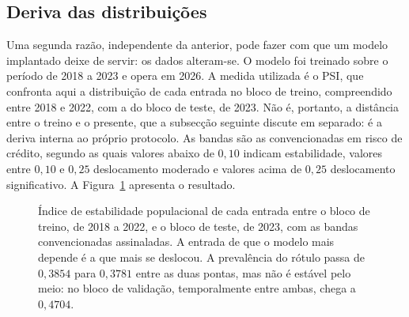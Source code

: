 \subsection{Deriva das distribuições}

Uma segunda razão, independente da anterior, pode fazer com que um modelo implantado deixe de servir:
os dados alteram-se. O modelo foi treinado sobre o período de 2018 a 2023 e opera em 2026. A medida
utilizada é o \gls{PSI}, que confronta aqui a distribuição de cada entrada no bloco de treino,
compreendido entre 2018 e 2022, com a do bloco de teste, de 2023. Não é, portanto, a distância entre
o treino e o presente, que a subsecção seguinte discute em separado: é a deriva interna ao próprio
protocolo. As bandas são as convencionadas em risco de crédito, segundo as quais valores
abaixo de $0{,}10$
indicam estabilidade, valores entre $0{,}10$ e $0{,}25$ deslocamento moderado e valores acima de
$0{,}25$ deslocamento significativo. A Figura~\ref{fig:av_deriva} apresenta o resultado.

\begin{figure}[ht]
\centering
{}
\caption[Deslocamento das distribuições de entrada]{Índice de estabilidade populacional de cada
entrada entre o bloco de treino, de 2018 a 2022, e o bloco de teste, de 2023, com as bandas
convencionadas assinaladas. A entrada de que o modelo mais depende é a que mais se deslocou. A
prevalência do rótulo passa de $0{,}3854$ para $0{,}3781$ entre as duas pontas, mas não é estável
pelo meio: no bloco de validação, temporalmente entre ambas, chega a $0{,}4704$.}
\label{fig:av_deriva}
\end{figure}

